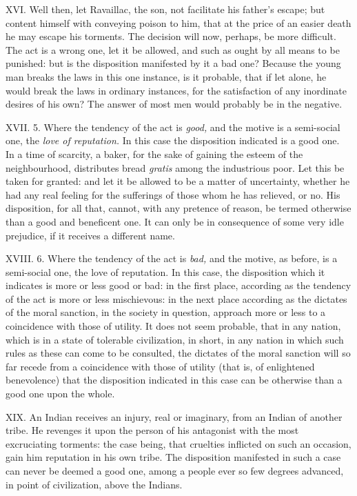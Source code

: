 \documentclass[12pt]{report}
\begin{document}
XVI. Well then, let Ravaillac, the son, not facilitate his father's
escape; but content himself with conveying poison to him, that at the
price of an easier death he may escape his torments. The decision will
now, perhaps, be more difficult. The act is a wrong one, let it be
allowed, and such as ought by all means to be punished: but is the
disposition manifested by it a bad one? Because the young man breaks the
laws in this one instance, is it probable, that if let alone, he would
break the laws in ordinary instances, for the satisfaction of any
inordinate desires of his own? The answer of most men would probably be
in the negative.

XVII. 5. Where the tendency of the act is \emph{good,} and the motive is
a semi-social one, the \emph{love of reputation.} In this case the
disposition indicated is a good one.\\
In a time of scarcity, a baker, for the sake of gaining the esteem of
the neighbourhood, distributes bread \emph{gratis} among the industrious
poor. Let this be taken for granted: and let it be allowed to be a
matter of uncertainty, whether he had any real feeling for the
sufferings of those whom he has relieved, or no. His disposition, for
all that, cannot, with any pretence of reason, be termed otherwise than
a good and beneficent one. It can only be in consequence of some very
idle prejudice, if it receives a different name.

XVIII. 6. Where the tendency of the act is \emph{bad,} and the motive,
as before, is a semi-social one, the love of reputation. In this case,
the disposition which it indicates is more or less good or bad: in the
first place, according as the tendency of the act is more or less
mischievous: in the next place according as the dictates of the moral
sanction, in the society in question, approach more or less to a
coincidence with those of utility. It does not seem probable, that in
any nation, which is in a state of tolerable civilization, in short, in
any nation in which such rules as these can come to be consulted, the
dictates of the moral sanction will so far recede from a coincidence
with those of utility (that is, of enlightened benevolence) that the
disposition indicated in this case can be otherwise than a good one upon
the whole.

XIX. An Indian receives an injury, real or imaginary, from an Indian of
another tribe. He revenges it upon the person of his antagonist with the
most excruciating torments: the case being, that cruelties inflicted on
such an occasion, gain him reputation in his own tribe. The disposition
manifested in such a case can never be deemed a good one, among a people
ever so few degrees advanced, in point of civilization, above the
Indians.
\end{document}
